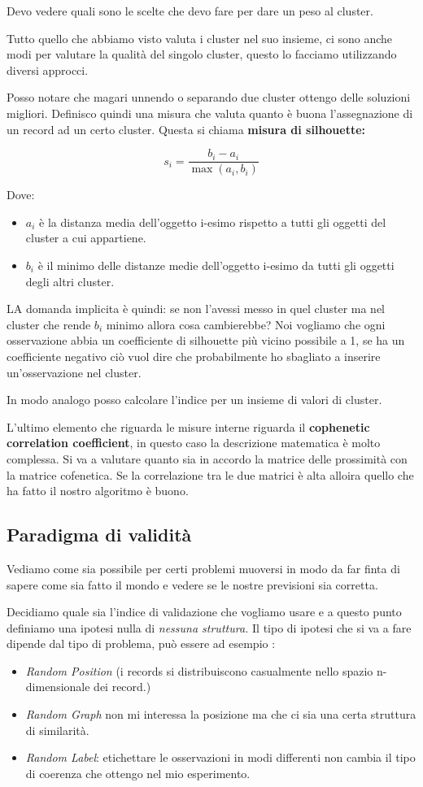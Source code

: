\documentclass[12pt, a4paper,titlepage,openany]{article}
\begin{document}
Devo vedere quali sono le scelte che devo fare per dare un peso al cluster.

Tutto quello che abbiamo visto valuta i cluster nel suo insieme, ci sono anche modi per valutare la qualità del singolo cluster, questo lo facciamo utilizzando diversi approcci.

Posso notare che magari unnendo o separando due cluster ottengo delle soluzioni migliori. Definisco quindi una misura che valuta quanto è buona l'assegnazione di un record ad un certo cluster.
Questa si chiama \textbf{misura di silhouette:}

\[s_{i} = \frac{b_{i}- a_{i}}{\max(a_{i},b_{i})}\]

Dove:
\begin{itemize}
	\item $a_{i}$ è la distanza media dell'oggetto i-esimo rispetto a tutti gli oggetti del cluster a cui appartiene.
	\item $b_{i}$ è il minimo delle distanze medie dell'oggetto i-esimo da tutti gli oggetti degli altri cluster.
\end{itemize}
LA domanda implicita è quindi: se non l'avessi messo in quel cluster ma nel cluster che rende $b_{i}$ minimo allora cosa cambierebbe? Noi vogliamo che ogni osservazione abbia un coefficiente di silhouette più vicino possibile a 1, se ha un coefficiente negativo ciò vuol dire che probabilmente ho sbagliato a inserire un'osservazione nel cluster.

In modo analogo posso calcolare l'indice per un insieme di valori di cluster.

L'ultimo elemento che riguarda le misure interne riguarda il \textbf{cophenetic correlation coefficient}, in questo caso la descrizione matematica è molto complessa. Si va a valutare quanto sia in accordo la matrice delle prossimità con la matrice cofenetica. Se la correlazione tra le due matrici è alta alloira quello che ha fatto il nostro algoritmo è buono.

\subsection{Paradigma di validità }

Vediamo come sia possibile per certi problemi muoversi in modo da far finta di sapere come sia fatto il mondo e vedere se le nostre previsioni sia corretta.

Decidiamo quale sia l'indice di validazione che vogliamo usare e a questo punto definiamo una ipotesi nulla di \textit{nessuna struttura.} Il tipo di ipotesi che si va a fare dipende dal tipo di problema, può essere ad esempio :
\begin{itemize}
	\item \textit{Random Position} (i records si distribuiscono casualmente nello spazio n-dimensionale dei record.)
	\item \textit{Random Graph } non mi interessa la posizione ma che ci sia una certa struttura di similarità.
	\item \textit{Random Label}: etichettare le osservazioni in modi differenti non cambia il tipo di coerenza che ottengo nel mio esperimento.
\end{itemize}
\end{document}
